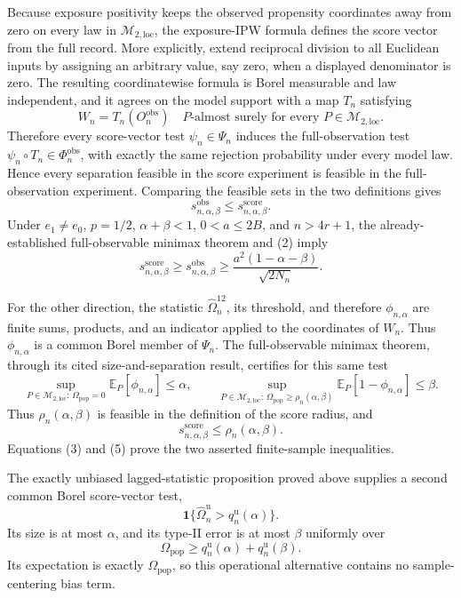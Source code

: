 Because exposure positivity keeps the observed propensity coordinates away from zero on every law in \(\mathcal M_{2,\mathrm{loc}}\), the exposure-IPW formula defines the score vector from the full record.  More explicitly, extend reciprocal division to all Euclidean inputs by assigning an arbitrary value, say zero, when a displayed denominator is zero.  The resulting coordinatewise formula is Borel measurable and law independent, and it agrees on the model support with a map \(T_n\) satisfying
\[
 W_n=T_n(O_n^{\mathrm{obs}})
 \quad P\text{-almost surely for every }P\in\mathcal M_{2,\mathrm{loc}}. \tag{1}
\]
Therefore every score-vector test \(\psi_n\in\Psi_n\) induces the full-observation test \(\psi_n\circ T_n\in\Phi_n^{\mathrm{obs}}\), with exactly the same rejection probability under every model law.  Hence every separation feasible in the score experiment is feasible in the full-observation experiment.  Comparing the feasible sets in the two definitions gives
\[
 s_{n,\alpha,\beta}^{\mathrm{obs}}
 \le s_{n,\alpha,\beta}^{\mathrm{score}}. \tag{2}
\]
Under \(e_1\ne e_0\), \(p=1/2\), \(\alpha+\beta<1\), \(0<a\le2B\), and \(n>4r+1\), the already-established full-observable minimax theorem and (2) imply
\[
 s_{n,\alpha,\beta}^{\mathrm{score}}
 \ge s_{n,\alpha,\beta}^{\mathrm{obs}}
 \ge \frac{a^2(1-\alpha-\beta)}{\sqrt{2N_n}}. \tag{3}
\]

For the other direction, the statistic \(\widehat\Omega_n^{12}\), its threshold, and therefore \(\phi_{n,\alpha}\) are finite sums, products, and an indicator applied to the coordinates of \(W_n\).  Thus \(\phi_{n,\alpha}\) is a common Borel member of \(\Psi_n\).  The full-observable minimax theorem, through its cited size-and-separation result, certifies for this same test
\[
 \sup_{P\in\mathcal M_{2,\mathrm{loc}}:\,\Omega_{\mathrm{pop}}=0}
 \mathbb E_P[\phi_{n,\alpha}]\le\alpha,
 \qquad
 \sup_{P\in\mathcal M_{2,\mathrm{loc}}:\,\Omega_{\mathrm{pop}}\ge\rho_n(\alpha,\beta)}
 \mathbb E_P[1-\phi_{n,\alpha}]\le\beta. \tag{4}
\]
Thus \(\rho_n(\alpha,\beta)\) is feasible in the definition of the score radius, and
\[
 s_{n,\alpha,\beta}^{\mathrm{score}}
 \le\rho_n(\alpha,\beta). \tag{5}
\]
Equations (3) and (5) prove the two asserted finite-sample inequalities.

The exactly unbiased lagged-statistic proposition proved above supplies a second common Borel score-vector test,
\[
 \mathbf 1\{\widehat\Omega_n^{\mathrm u}>q_n^{\mathrm u}(\alpha)\}. \tag{6}
\]
Its size is at most \(\alpha\), and its type-II error is at most \(\beta\) uniformly over
\[
 \Omega_{\mathrm{pop}}
 \ge q_n^{\mathrm u}(\alpha)+q_n^{\mathrm u}(\beta). \tag{7}
\]
Its expectation is exactly \(\Omega_{\mathrm{pop}}\), so this operational alternative contains no sample-centering bias term.

